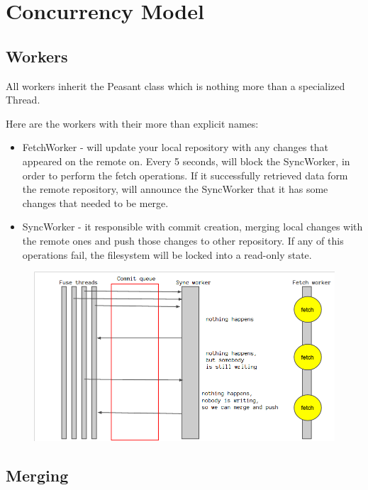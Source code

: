 \chapter{Concurrency Model}

\label{ch:concurrencymodel}

\section{Workers}
    All workers inherit the Peasant class which is nothing more than a specialized Thread.

    Here are the workers with their more than explicit names:
    \begin{itemize}
        \item FetchWorker - will update your local repository with any changes that appeared on the remote on. Every 5 seconds, will block the SyncWorker, in order to perform the fetch operations. If it successfully retrieved data form the remote repository, will announce the SyncWorker that it has some changes that needed to be merge.
        \item SyncWorker - it responsible with commit creation, merging local changes with the remote ones and push those changes to other repository. If any of this operations fail, the filesystem will be locked into a read-only state.
    \end{itemize}
    
    \begin{figure}[h]
      \begin{center}
        \includegraphics[width=16cm]{concurrency/gitfs.png}
      \end{center}
   \end{figure}
\section{Merging}
